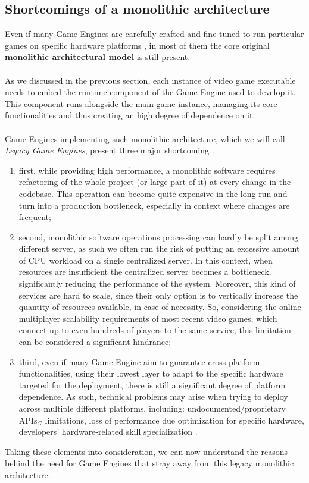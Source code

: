 \subsection{Shortcomings of a monolithic architecture}
Even if many Game Engines are carefully crafted and fine-tuned to run particular games on specific hardware platforms \cite{womak:gregory-game-engine}, in most of them the core original \textbf{monolithic architectural model} is still present. \\ \\
As we discussed in the previous section, each instance of video game executable needs to embed the runtime component of the Game Engine used to develop it. This component runs alongside the main game instance, managing its core functionalities and thus creating an high degree of dependence on it. \\ \\
Game Engines implementing such monolithic architecture, which we will call \textit{Legacy Game Engines}, present three major shortcoming \cite{womak:revamping-cloud-games}:
\begin{enumerate}
	\item first, while providing high performance, a monolithic software requires refactoring of the whole project (or large part of it) at every change in the codebase. This operation can become quite expensive in the long run and turn into a production bottleneck, especially in context where changes are frequent;
	\item second, monolithic software operations processing can hardly be split among different server, as such we often run the risk of putting an excessive amount of CPU workload on a single centralized server. In this context, when resources are insufficient the centralized server becomes a bottleneck, significantly reducing the performance of the system. Moreover, this kind of services are hard to scale, since their only option is to vertically increase the quantity of resources available, in case of necessity. So, considering the online multiplayer scalability requirements of most recent video games, which connect up to even hundreds of players \cite{site:mmo-wiki} to the same service, this limitation can be considered a significant hindrance;
	\item third, even if many Game Engine aim to guarantee cross-platform functionalities, using their lowest layer to adapt to the specific hardware targeted for the deployment, there is still a significant degree of platform dependence. As such, technical problems may arise when trying to deploy across multiple different platforms, including: undocumented/proprietary APIs$_G$ limitations, loss of performance due optimization for specific hardware, developers' hardware-related skill specialization \cite{womak:smash-distributed-game-engine}.
\end{enumerate}
Taking these elements into consideration, we can now understand the reasons behind the need for Game Engines that stray away from this legacy monolithic architecture.

